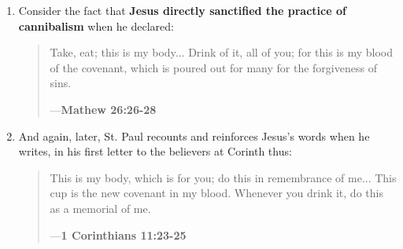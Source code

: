 \documentclass[a4paper]{article}
\begin{document}
\begin{enumerate}
\item{Consider the fact that \textbf{Jesus directly sanctified the practice of cannibalism} when he declared:


\noindent
\begin{minipage}{1\textwidth}
\vspace{1em}
\begin{quotation}
{\ttfamily

Take, eat; this is my body... Drink of it, all of you; for this is my blood of the covenant, which is poured out for many for the forgiveness of sins.

}
\hspace*{\fill} ---\textbf{Mathew 26:26-28}
\end{quotation}
\vspace{1em}
\end{minipage}

}
\item{ And again, later, St. Paul recounts and reinforces Jesus's words when he writes, in his first letter to the believers at Corinth thus:

\noindent
\begin{minipage}{1\textwidth}
\vspace{1em}
\begin{quotation}
{\ttfamily

This is my body, which is for you; do this in remembrance of me... This cup is the new covenant in my blood. Whenever you drink it, do this as a memorial of me.

}
\hspace*{\fill} ---\textbf{1 Corinthians 11:23-25}
\end{quotation}
\vspace{1em}
\end{minipage}

}
\end{enumerate}
\end{document}
